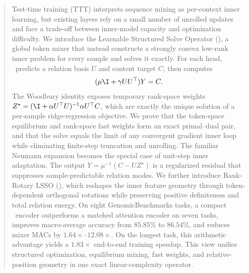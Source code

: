 \begin{abstract}
Test-time training (TTT) interprets sequence mixing as per-context inner learning, but existing layers rely on a small number of unrolled updates and face a trade-off between inner-model capacity and optimization difficulty. We introduce the Learnable Structured Solve Operator (\LSSO), a global token mixer that instead constructs a strongly convex low-rank inner problem for every sample and solves it exactly. For each head, \LSSO\ predicts a relation basis $U$ and content target $C$, then computes
\[
  (\mu \I + \gamma U U^\top)Y=C.
\]
The Woodbury identity exposes temporary rank-space weights
$Z^\star=(\I+\alpha U^\top U)^{-1}\alpha U^\top C$, which are exactly the unique solution of a per-sample ridge-regression objective. We prove that the token-space equilibrium and rank-space fast weights form an exact primal--dual pair, and that the solve equals the limit of any convergent gradient inner loop while eliminating finite-step truncation and unrolling. The familiar Neumann expansion becomes the special case of unit-step inner adaptation. The output $Y=\mu^{-1}(C-UZ^\star)$ is a regularized residual that suppresses sample-predictable relation modes. We further introduce Rank-Rotary LSSO (\RRLSSO), which reshapes the inner feature geometry through token-dependent orthogonal rotations while preserving positive definiteness and total relation energy. On eight GenomicBenchmarks tasks, a compact \RRLSSO\ encoder outperforms a matched attention encoder on seven tasks, improves macro-average accuracy from $85.85\%$ to $86.54\%$, and reduces mixer MACs by $1.64\times$--$12.08\times$. On the longest task, this arithmetic advantage yields a $1.83\times$ end-to-end training speedup. This view unifies structured optimization, equilibrium mixing, fast weights, and relative-position geometry in one exact linear-complexity operator.
\end{abstract}
